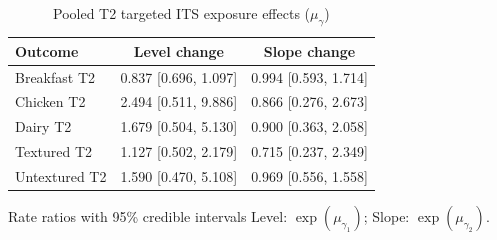 \begin{table}[H]
\centering
\caption{Pooled T2 targeted ITS exposure effects ($\mu_\gamma$)}
\label{tab:a4_t2_mu_gamma}
\begin{tabular}{lcc}
\toprule
Outcome & Level change & Slope change \\
\midrule
Breakfast T2 & 0.837 [0.696, 1.097] & 0.994 [0.593, 1.714] \\
Chicken T2 & 2.494 [0.511, 9.886] & 0.866 [0.276, 2.673] \\
Dairy T2 & 1.679 [0.504, 5.130] & 0.900 [0.363, 2.058] \\
Textured T2 & 1.127 [0.502, 2.179] & 0.715 [0.237, 2.349] \\
Untextured T2 & 1.590 [0.470, 5.108] & 0.969 [0.556, 1.558] \\
\bottomrule
\end{tabular}
\par\smallskip\footnotesize Rate ratios with 95\% credible intervals Level: $\exp(\mu_{\gamma_1})$; Slope: $\exp(\mu_{\gamma_2})$.
\end{table}
